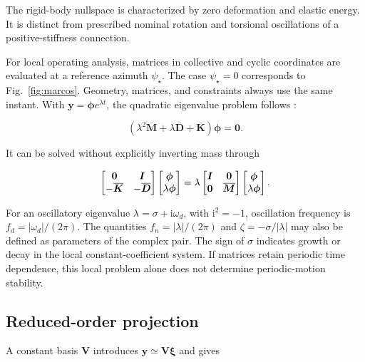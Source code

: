 The rigid-body nullspace is characterized by zero deformation and elastic energy. It is distinct from prescribed nominal rotation and torsional oscillations of a positive-stiffness connection.

For local operating analysis, matrices in collective and cyclic coordinates are evaluated at a reference azimuth $\psi_\star$. The case $\psi_\star=0$ corresponds to Fig.~\ref{fig:marcos}. Geometry, matrices, and constraints always use the same instant. With $\bm y=\bm\phi e^{\lambda t}$, the quadratic eigenvalue problem follows \citep{tisseur2001}:

\begin{equation}
(\lambda^2\overline{\bm M}+\lambda\overline{\bm D}+\overline{\bm K})\bm\phi=\bm0.
\label{eq:QEP}
\end{equation}

It can be solved without explicitly inverting mass through

\begin{equation}
\begin{bmatrix}\bm0&\bm I\\-\overline{\bm K}&-\overline{\bm D}\end{bmatrix}
\begin{bmatrix}\bm\phi\\\lambda\bm\phi\end{bmatrix}
=\lambda\begin{bmatrix}\bm I&\bm0\\\bm0&\overline{\bm M}\end{bmatrix}
\begin{bmatrix}\bm\phi\\\lambda\bm\phi\end{bmatrix}.
\end{equation}

For an oscillatory eigenvalue $\lambda=\sigma+\mathrm i\omega_d$, with $\mathrm i^2=-1$, oscillation frequency is $f_d=|\omega_d|/(2\pi)$. The quantities $f_n=|\lambda|/(2\pi)$ and $\zeta=-\sigma/|\lambda|$ may also be defined as parameters of the complex pair. The sign of $\sigma$ indicates growth or decay in the local constant-coefficient system. If matrices retain periodic time dependence, this local problem alone does not determine periodic-motion stability.

\subsection{Reduced-order projection}
A constant basis $\bm V$ introduces $\bm y\simeq\bm V\bm\xi$ and gives

